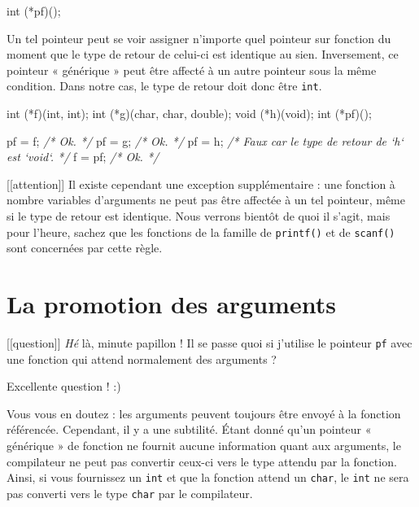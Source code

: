 \documentclass[]{article}
\newenvironment{Shaded}{}{}
\newcommand{\DataTypeTok}[1]{\textcolor[rgb]{0.56,0.13,0.00}{{#1}}}
\newcommand{\CommentTok}[1]{\textcolor[rgb]{0.38,0.63,0.69}{\textit{{#1}}}}
\newcommand{\NormalTok}[1]{{#1}}
\begin{document}
\begin{Shaded}
\begin{Highlighting}[]
\DataTypeTok{int} \NormalTok{(*pf)();}
\end{Highlighting}
\end{Shaded}

Un tel pointeur peut se voir assigner n'importe quel pointeur sur
fonction du moment que le type de retour de celui-ci est identique au
sien. Inversement, ce pointeur « générique » peut être affecté à un
autre pointeur sous la même condition. Dans notre cas, le type de retour
doit donc être \texttt{int}.

\begin{Shaded}
\begin{Highlighting}[]
\DataTypeTok{int} \NormalTok{(*f)(}\DataTypeTok{int}\NormalTok{, }\DataTypeTok{int}\NormalTok{);}
\DataTypeTok{int} \NormalTok{(*g)(}\DataTypeTok{char}\NormalTok{, }\DataTypeTok{char}\NormalTok{, }\DataTypeTok{double}\NormalTok{);}
\DataTypeTok{void} \NormalTok{(*h)(}\DataTypeTok{void}\NormalTok{);}
\DataTypeTok{int} \NormalTok{(*pf)();}

\NormalTok{pf = f; }\CommentTok{/* Ok. */}
\NormalTok{pf = g; }\CommentTok{/* Ok. */}
\NormalTok{pf = h; }\CommentTok{/* Faux car le type de retour de `h` est `void`. */}
\NormalTok{f = pf; }\CommentTok{/* Ok. */}
\end{Highlighting}
\end{Shaded}

{[}{[}attention{]}{]} \textbar{} Il existe cependant une exception
supplémentaire : une fonction à nombre variables d'arguments ne peut pas
être affectée à un tel pointeur, même si le type de retour est
identique. Nous verrons bientôt de quoi il s'agit, mais pour l'heure,
sachez que les fonctions de la famille de \texttt{printf()} et de
\texttt{scanf()} sont concernées par cette règle.

\section{La promotion des arguments}\label{la-promotion-des-arguments}

{[}{[}question{]}{]} \textbar{} \emph{Hé} là, minute papillon ! Il se
passe quoi si j'utilise le pointeur \texttt{pf} avec une fonction qui
attend normalement des arguments ?

Excellente question ! :)

Vous vous en doutez : les arguments peuvent toujours être envoyé à la
fonction référencée. Cependant, il y a une subtilité. Étant donné qu'un
pointeur « générique » de fonction ne fournit aucune information quant
aux arguments, le compilateur ne peut pas convertir ceux-ci vers le type
attendu par la fonction. Ainsi, si vous fournissez un \texttt{int} et
que la fonction attend un \texttt{char}, le \texttt{int} ne sera pas
converti vers le type \texttt{char} par le compilateur.
\end{document}

